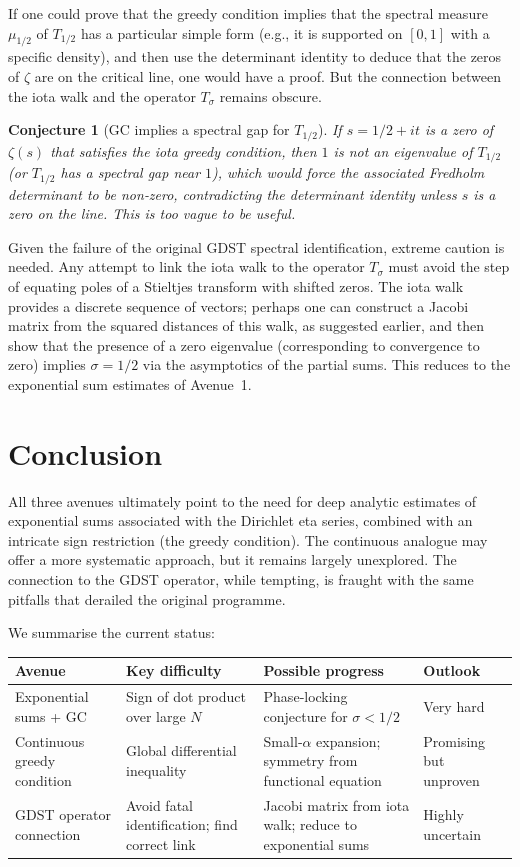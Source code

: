 \documentclass[11pt,a4paper]{article}
\newtheorem{conjecture}[theorem]{Conjecture}
\begin{document}
If one could prove that the greedy condition implies that the spectral measure $\mu_{1/2}$ of $T_{1/2}$ has a particular simple form (e.g., it is supported on $[0,1]$ with a specific density), and then use the determinant identity to deduce that the zeros of $\zeta$ are on the critical line, one would have a proof.  But the connection between the iota walk and the operator $T_\sigma$ remains obscure.

\begin{conjecture}[GC implies a spectral gap for $T_{1/2}$]\label{conj:gap}
If $s = 1/2 + it$ is a zero of $\zeta(s)$ that satisfies the iota greedy condition, then $1$ is not an eigenvalue of $T_{1/2}$ (or $T_{1/2}$ has a spectral gap near $1$), which would force the associated Fredholm determinant to be non‑zero, contradicting the determinant identity unless $s$ is a zero on the line.  This is too vague to be useful.
\end{conjecture}

Given the failure of the original GDST spectral identification, extreme caution is needed.  Any attempt to link the iota walk to the operator $T_\sigma$ must avoid the step of equating poles of a Stieltjes transform with shifted zeros.  The iota walk provides a discrete sequence of vectors; perhaps one can construct a Jacobi matrix from the squared distances of this walk, as suggested earlier, and then show that the presence of a zero eigenvalue (corresponding to convergence to zero) implies $\sigma = 1/2$ via the asymptotics of the partial sums.  This reduces to the exponential sum estimates of Avenue~1.

\section{Conclusion}
All three avenues ultimately point to the need for deep analytic estimates of exponential sums associated with the Dirichlet eta series, combined with an intricate sign restriction (the greedy condition).  The continuous analogue may offer a more systematic approach, but it remains largely unexplored.  The connection to the GDST operator, while tempting, is fraught with the same pitfalls that derailed the original programme.

We summarise the current status:

\begin{center}
\begin{tabular}{|p{3.5cm}|p{3.5cm}|p{3.5cm}|p{2.5cm}|}
\hline
\textbf{Avenue} & \textbf{Key difficulty} & \textbf{Possible progress} & \textbf{Outlook} \\
\hline
Exponential sums + GC & Sign of dot product over large $N$ & Phase‑locking conjecture for $\sigma<1/2$ & Very hard \\
\hline
Continuous greedy condition & Global differential inequality & Small‑$\alpha$ expansion; symmetry from functional equation & Promising but unproven \\
\hline
GDST operator connection & Avoid fatal identification; find correct link & Jacobi matrix from iota walk; reduce to exponential sums & Highly uncertain \\
\hline
\end{tabular}
\end{center}
\end{document}
